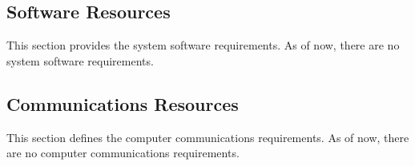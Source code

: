 \subsection{Software Resources}
\label{lab:ssec_TechnologyResourceSoftware}
This section provides the system software requirements. As of now, there are no system software requirements.
\KNEADSUBSECTIONNEWPAGE
\subsection{Communications Resources}
\label{lab:ssec_TechnologyResourceCommunications}
This section defines the computer communications requirements. As of now, there are no computer communications requirements.
\KNEADSUBSECTIONNEWPAGE
